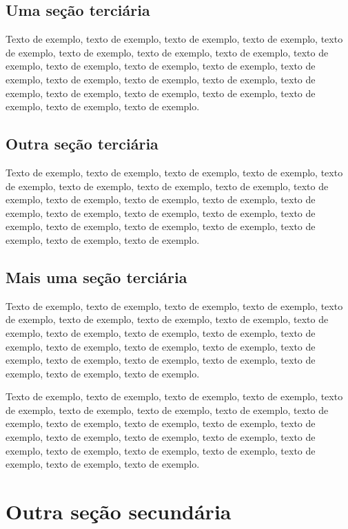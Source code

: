 \documentclass[
	12pt,				%
	oneside,			%
	a4paper,			%
	english,			%
	brazil				%
	]{abntex2ppgsi}
\begin{document}
\subsection{Uma seção terciária}

Texto de exemplo, texto de exemplo, texto de exemplo, texto de exemplo, texto de exemplo, texto de exemplo, texto de exemplo, texto de exemplo, texto de exemplo, texto de exemplo, texto de exemplo, texto de exemplo, texto de exemplo, texto de exemplo, texto de exemplo, texto de exemplo, texto de exemplo, texto de exemplo, texto de exemplo, texto de exemplo, texto de exemplo, texto de exemplo, texto de exemplo.

\subsection{Outra seção terciária}

Texto de exemplo, texto de exemplo, texto de exemplo, texto de exemplo, texto de exemplo, texto de exemplo, texto de exemplo, texto de exemplo, texto de exemplo, texto de exemplo, texto de exemplo, texto de exemplo, texto de exemplo, texto de exemplo, texto de exemplo, texto de exemplo, texto de exemplo, texto de exemplo, texto de exemplo, texto de exemplo, texto de exemplo, texto de exemplo, texto de exemplo.

\subsection{Mais uma seção terciária}

Texto de exemplo, texto de exemplo, texto de exemplo, texto de exemplo, texto de exemplo, texto de exemplo, texto de exemplo, texto de exemplo, texto de exemplo, texto de exemplo, texto de exemplo, texto de exemplo, texto de exemplo, texto de exemplo, texto de exemplo, texto de exemplo, texto de exemplo, texto de exemplo, texto de exemplo, texto de exemplo, texto de exemplo, texto de exemplo, texto de exemplo.

Texto de exemplo, texto de exemplo, texto de exemplo, texto de exemplo, texto de exemplo, texto de exemplo, texto de exemplo, texto de exemplo, texto de exemplo, texto de exemplo, texto de exemplo, texto de exemplo, texto de exemplo, texto de exemplo, texto de exemplo, texto de exemplo, texto de exemplo, texto de exemplo, texto de exemplo, texto de exemplo, texto de exemplo, texto de exemplo, texto de exemplo.

\section{Outra seção secundária}
\end{document}
